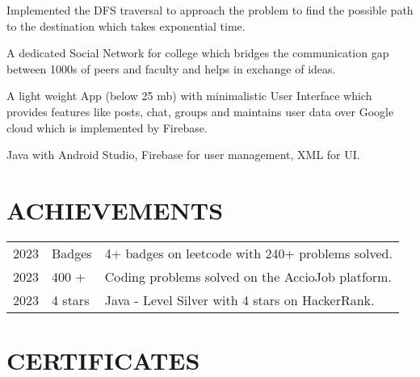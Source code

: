 \documentclass[]{deedy-resume-openfont}
\begin{document}
\begin{minipage}[t]{0.66\textwidth}
\begin{tightemize}
\item Implemented the DFS traversal to approach the problem to find the possible path to the destination which takes exponential time.

\end{tightemize}
\sectionsep

\begin{tightemize}
\item A dedicated Social Network for college which bridges the communication gap between 1000s of peers and faculty and helps in exchange of ideas.
\item A light weight App (below 25 mb) with minimalistic User Interface which provides features like posts, chat, groups and maintains user data over Google cloud which is implemented by Firebase. 
\item Java with Android Studio, Firebase for user management, XML for UI.
\end{tightemize}
\sectionsep




\sectionsep


\section{ACHIEVEMENTS} 
\begin{tabular}{rll}
2023	  & Badges  &  4+ badges on leetcode with 240+ problems solved.\\
2023	  & 400 +  & Coding problems solved on the AccioJob platform. \\
2023      & 4 stars & Java - Level Silver with 4 stars on HackerRank. \\


\end{tabular}



\section{CERTIFICATES}


\end{minipage}
\end{document}
